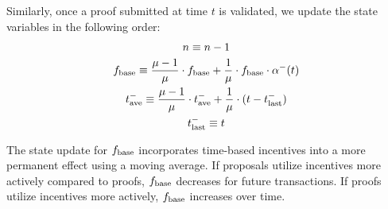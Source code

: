 Similarly, once a proof submitted at time $t$ is validated, we update the state variables in the following order:
\begin{gather}
    n \equiv n - 1
\\
f_\textnormal{base} \equiv
\frac{\mu-1}{\mu} \cdot f_\textnormal{base} + \frac{1}{\mu} \cdot f_\textnormal{base} \cdot \alpha^-(t)
\\
t^-_\textnormal{ave} \equiv
\frac{\mu-1}{\mu} \cdot t^-_\textnormal{ave} + \frac{1}{\mu} \cdot (t-t^-_\textnormal{last})
\\
t^-_\textnormal{last} \equiv t
\end{gather}


The state update for $f_\textnormal{base}$ incorporates time-based incentives into a more permanent effect using a moving average. If proposals utilize incentives more actively compared to proofs, $f_\textnormal{base}$ decreases for future transactions. If proofs utilize incentives more actively, $f_\textnormal{base}$ increases over time.



\label{sec:priceStateUpdate}
\color{Black}

